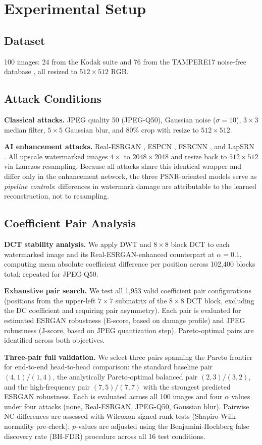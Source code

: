 \documentclass[conference]{IEEEtran}
\begin{document}
\section{Experimental Setup}
\label{sec:setup}

\subsection{Dataset}
100 images: 24 from the Kodak suite \cite{kodak} and 76 from the
TAMPERE17 noise-free database \cite{tampere17}, all resized to
$512\times512$ RGB.

\subsection{Attack Conditions}
\textbf{Classical attacks.} JPEG quality 50 (JPEG-Q50), Gaussian noise
($\sigma=10$), $3\times3$ median filter, $5\times5$ Gaussian blur, and
80\% crop with resize to $512\times512$.

\textbf{AI enhancement attacks.} Real-ESRGAN \cite{realesrgan2021},
ESPCN \cite{espcn2016}, FSRCNN \cite{fsrcnn2016}, and LapSRN
\cite{lapsrn2017}. All upscale watermarked images $4\times$ to
$2048\times2048$ and resize back to $512\times512$ via Lanczos
resampling. Because all attacks share this identical wrapper and differ
only in the enhancement network, the three PSNR-oriented models serve as
\emph{pipeline controls}: differences in watermark damage are
attributable to the learned reconstruction, not to resampling.

\subsection{Coefficient Pair Analysis}
\textbf{DCT stability analysis.} We apply DWT and $8\times8$ block DCT
to each watermarked image and its Real-ESRGAN-enhanced counterpart at
$\alpha=0.1$, computing mean absolute coefficient difference per position
across 102,400 blocks total; repeated for JPEG-Q50.

\textbf{Exhaustive pair search.} We test all 1,953 valid coefficient
pair configurations (positions from the upper-left $7\times7$ submatrix
of the $8\times8$ DCT block, excluding the DC coefficient and requiring
pair asymmetry). Each pair is evaluated for estimated ESRGAN robustness
(E-score, based on damage profile) and JPEG robustness (J-score, based
on JPEG quantization step). Pareto-optimal pairs are identified across
both objectives.

\textbf{Three-pair full validation.} We select three pairs spanning the
Pareto frontier for end-to-end head-to-head comparison: the standard
baseline pair $(4,1)/(1,4)$, the analytically Pareto-optimal balanced
pair $(2,3)/(3,2)$, and the high-frequency pair $(7,5)/(7,7)$ with the
strongest predicted ESRGAN robustness. Each is evaluated across all 100
images and four $\alpha$ values under four attacks (none, Real-ESRGAN,
JPEG-Q50, Gaussian blur). Pairwise NC differences are assessed with
Wilcoxon signed-rank tests (Shapiro-Wilk normality pre-check); $p$-values
are adjusted using the Benjamini-Hochberg false discovery rate (BH-FDR)
procedure across all 16 test conditions.
\end{document}
